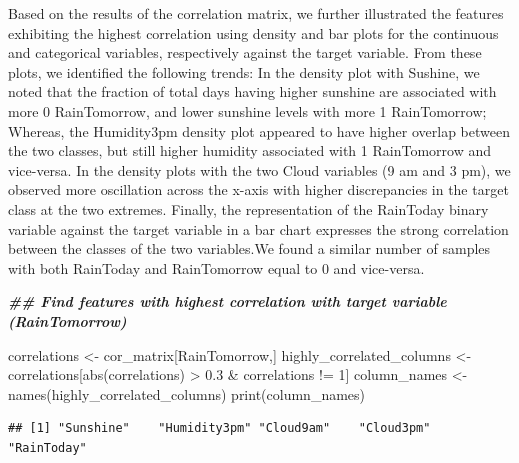 \documentclass[
]{article}
\newenvironment{Shaded}{\begin{snugshade}}{\end{snugshade}}
\newcommand{\DecValTok}[1]{\textcolor[rgb]{0.00,0.00,0.81}{#1}}
\newcommand{\DocumentationTok}[1]{\textcolor[rgb]{0.56,0.35,0.01}{\textbf{\textit{#1}}}}
\newcommand{\FloatTok}[1]{\textcolor[rgb]{0.00,0.00,0.81}{#1}}
\newcommand{\FunctionTok}[1]{\textcolor[rgb]{0.00,0.00,0.00}{#1}}
\newcommand{\NormalTok}[1]{#1}
\newcommand{\OtherTok}[1]{\textcolor[rgb]{0.56,0.35,0.01}{#1}}
\newcommand{\SpecialCharTok}[1]{\textcolor[rgb]{0.00,0.00,0.00}{#1}}
\newcommand{\StringTok}[1]{\textcolor[rgb]{0.31,0.60,0.02}{#1}}
\begin{document}
Based on the results of the correlation matrix, we further illustrated
the features exhibiting the highest correlation using density and bar
plots for the continuous and categorical variables, respectively against
the target variable. From these plots, we identified the following
trends: In the density plot with Sushine, we noted that the fraction of
total days having higher sunshine are associated with more 0
RainTomorrow, and lower sunshine levels with more 1 RainTomorrow;
Whereas, the Humidity3pm density plot appeared to have higher overlap
between the two classes, but still higher humidity associated with 1
RainTomorrow and vice-versa. In the density plots with the two Cloud
variables (9 am and 3 pm), we observed more oscillation across the
x-axis with higher discrepancies in the target class at the two
extremes. Finally, the representation of the RainToday binary variable
against the target variable in a bar chart expresses the strong
correlation between the classes of the two variables.We found a similar
number of samples with both RainToday and RainTomorrow equal to 0 and
vice-versa.

\begin{Shaded}
\begin{Highlighting}[]
\DocumentationTok{\#\# Find features with highest correlation with target variable (RainTomorrow)}

\NormalTok{correlations }\OtherTok{\textless{}{-}}\NormalTok{ cor\_matrix[}\StringTok{\textquotesingle{}RainTomorrow\textquotesingle{}}\NormalTok{,]}
\NormalTok{highly\_correlated\_columns }\OtherTok{\textless{}{-}}\NormalTok{ correlations[}\FunctionTok{abs}\NormalTok{(correlations) }\SpecialCharTok{\textgreater{}} \FloatTok{0.3} \SpecialCharTok{\&} 
\NormalTok{                                            correlations }\SpecialCharTok{!=} \DecValTok{1}\NormalTok{] }
\NormalTok{column\_names }\OtherTok{\textless{}{-}} \FunctionTok{names}\NormalTok{(highly\_correlated\_columns)}
\FunctionTok{print}\NormalTok{(column\_names)}
\end{Highlighting}
\end{Shaded}

\begin{verbatim}
## [1] "Sunshine"    "Humidity3pm" "Cloud9am"    "Cloud3pm"    "RainToday"
\end{verbatim}
\end{document}
